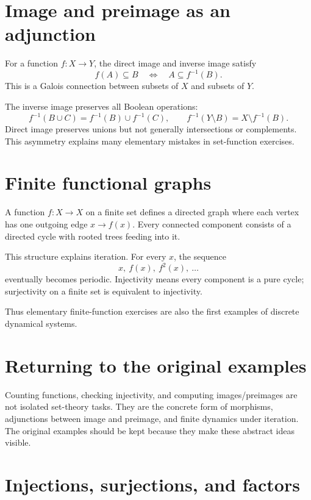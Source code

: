 \section{Image and preimage as an adjunction}

For a function $f:X\to Y$, the direct image and inverse image satisfy
\[
  f(A)\subseteq B\quad\Longleftrightarrow\quad A\subseteq f^{-1}(B).
\]
This is a Galois connection between subsets of $X$ and subsets of $Y$.

The inverse image preserves all Boolean operations:
\[
  f^{-1}(B\cup C)=f^{-1}(B)\cup f^{-1}(C),\qquad
  f^{-1}(Y\setminus B)=X\setminus f^{-1}(B).
\]
Direct image preserves unions but not generally intersections or complements.  This asymmetry explains many elementary mistakes in set-function exercises.

\section{Finite functional graphs}

A function $f:X\to X$ on a finite set defines a directed graph where each vertex has one outgoing edge $x\to f(x)$.  Every connected component consists of a directed cycle with rooted trees feeding into it.

This structure explains iteration.  For every $x$, the sequence
\[
  x,\ f(x),\ f^2(x),\ \ldots
\]
eventually becomes periodic.  Injectivity means every component is a pure cycle; surjectivity on a finite set is equivalent to injectivity.

Thus elementary finite-function exercises are also the first examples of discrete dynamical systems.

\section{Returning to the original examples}

Counting functions, checking injectivity, and computing images/preimages are not isolated set-theory tasks.  They are the concrete form of morphisms, adjunctions between image and preimage, and finite dynamics under iteration.  The original examples should be kept because they make these abstract ideas visible.

\section{Injections, surjections, and factors}

